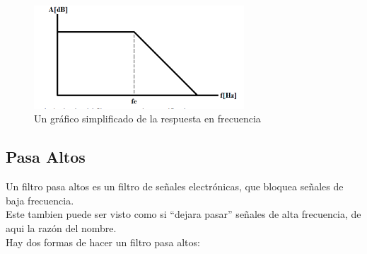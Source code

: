 \documentclass[../main.tex]{subfiles}
\begin{document}
		\begin{figure}[H]
			\centering
			\includegraphics[width=0.7\textwidth]{filtros/pasa-bajo_grafico.png}
			\caption{Un gráfico simplificado de la respuesta en frecuencia}
		\end{figure}
	\subsection{Pasa Altos}
	Un filtro pasa altos es un filtro de señales electrónicas, que bloquea señales de baja
	frecuencia. \\
	Este tambien puede ser visto como si ``dejara pasar'' señales de alta frecuencia, de aqui
	la razón del nombre. \\
	Hay dos formas de hacer un filtro pasa altos:

\end{document}
